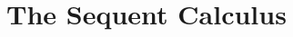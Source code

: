 \documentclass[open-logic-chapter]{subfiles}
\begin{document}
\chapter{The Sequent Calculus}








\end{document}
